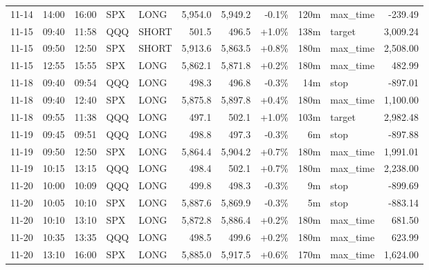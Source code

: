 \documentclass[11pt,a4paper,twoside]{article}
\begin{document}
\begin{center}
\begin{longtable}{>{\color{txtmain}}l l l l l r r r r >{\color{txtmain}}l r}
11-14 & 14:00 & 16:00 & SPX & LONG & 5,954.0 & 5,949.2 & \textcolor{lossred}{-0.1\%} & 120m & max\_time & \textcolor{lossred}{-239.49} \\
11-15 & 09:40 & 11:58 & QQQ & SHORT & 501.5 & 496.5 & \textcolor{wingreen}{+1.0\%} & 138m & target & \textcolor{wingreen}{3,009.24} \\
11-15 & 09:50 & 12:50 & SPX & SHORT & 5,913.6 & 5,863.5 & \textcolor{wingreen}{+0.8\%} & 180m & max\_time & \textcolor{wingreen}{2,508.00} \\
11-15 & 12:55 & 15:55 & SPX & LONG & 5,862.1 & 5,871.8 & \textcolor{wingreen}{+0.2\%} & 180m & max\_time & \textcolor{wingreen}{482.99} \\
11-18 & 09:40 & 09:54 & QQQ & LONG & 498.3 & 496.8 & \textcolor{lossred}{-0.3\%} & 14m & stop & \textcolor{lossred}{-897.01} \\
11-18 & 09:40 & 12:40 & SPX & LONG & 5,875.8 & 5,897.8 & \textcolor{wingreen}{+0.4\%} & 180m & max\_time & \textcolor{wingreen}{1,100.00} \\
11-18 & 09:55 & 11:38 & QQQ & LONG & 497.1 & 502.1 & \textcolor{wingreen}{+1.0\%} & 103m & target & \textcolor{wingreen}{2,982.48} \\
11-19 & 09:45 & 09:51 & QQQ & LONG & 498.8 & 497.3 & \textcolor{lossred}{-0.3\%} & 6m & stop & \textcolor{lossred}{-897.88} \\
11-19 & 09:50 & 12:50 & SPX & LONG & 5,864.4 & 5,904.2 & \textcolor{wingreen}{+0.7\%} & 180m & max\_time & \textcolor{wingreen}{1,991.01} \\
11-19 & 10:15 & 13:15 & QQQ & LONG & 498.4 & 502.1 & \textcolor{wingreen}{+0.7\%} & 180m & max\_time & \textcolor{wingreen}{2,238.00} \\
11-20 & 10:00 & 10:09 & QQQ & LONG & 499.8 & 498.3 & \textcolor{lossred}{-0.3\%} & 9m & stop & \textcolor{lossred}{-899.69} \\
11-20 & 10:05 & 10:10 & SPX & LONG & 5,887.6 & 5,869.9 & \textcolor{lossred}{-0.3\%} & 5m & stop & \textcolor{lossred}{-883.14} \\
11-20 & 10:10 & 13:10 & SPX & LONG & 5,872.8 & 5,886.4 & \textcolor{wingreen}{+0.2\%} & 180m & max\_time & \textcolor{wingreen}{681.50} \\
11-20 & 10:35 & 13:35 & QQQ & LONG & 498.5 & 499.6 & \textcolor{wingreen}{+0.2\%} & 180m & max\_time & \textcolor{wingreen}{623.99} \\
11-20 & 13:10 & 16:00 & SPX & LONG & 5,885.0 & 5,917.5 & \textcolor{wingreen}{+0.6\%} & 170m & max\_time & \textcolor{wingreen}{1,624.00} \\

\end{longtable}
\end{center}
\end{document}
